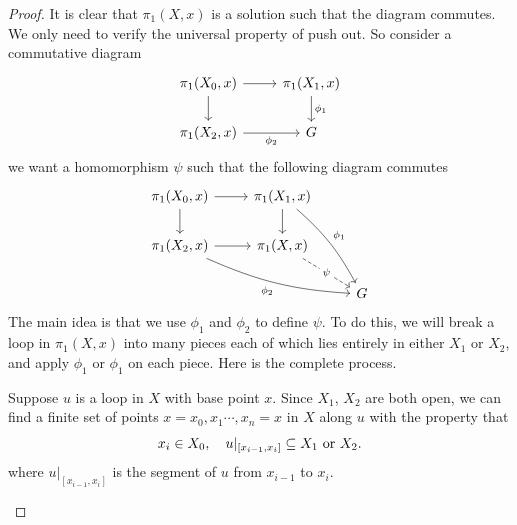 \begin{proof}
It is clear that $\pi_1(X,x)$ is a solution such that the diagram commutes. We only need to verify the universal property of push out. So consider a commutative diagram
\begin{equation}\label{van kam-1}
\begin{tikzcd}
\pi_1(X_0,x)\ar[r]\ar[d]&\pi_1(X_1,x)\ar[d,"\phi_1"]\\
\pi_1(X_2,x)\ar[r,swap,"\phi_2"]&G
\end{tikzcd}
\end{equation}
we want a homomorphism $\psi$ such that the following diagram commutes
\begin{equation}\label{van kam-2}
\begin{tikzcd}
\pi_1(X_0,x)\ar[r]\ar[d]&\pi_1(X_1,x)\ar[d]\ar[rdd,bend left=10,"\phi_1"]&\\
\pi_1(X_2,x)\ar[r]\ar[rrd,swap,bend right=10,"\phi_2"]&\pi_1(X,x)\ar[rd,dashed,"\psi"description]&\\
&&G
\end{tikzcd}
\end{equation}
The main idea is that we use $\phi_1$ and $\phi_2$ to define $\psi$. To do this, we will break a loop in $\pi_1(X,x)$ into many pieces each of which lies  entirely in either $X_1$ or $X_2$, and apply $\phi_1$ or $\phi_1$ on each piece. Here is the complete process.\par
Suppose $u$ is a loop in $X$ with base point $x$. Since $X_1$, $X_2$ are both open, we can find a finite set of points $x=x_0,x_1\cdots,x_n=x$ in $X$ along $u$ with the property that 
\[x_i\in X_0,\quad u|_{[x_{i-1},x_i]}\subseteq X_1\text{ or }X_2.\]
where $u|_{[x_{i-1},x_i]}$ is the segment of $u$ from $x_{i-1}$ to $x_i$.
\begin{figure}[htbp]
\centering

\end{figure}
\end{proof}
